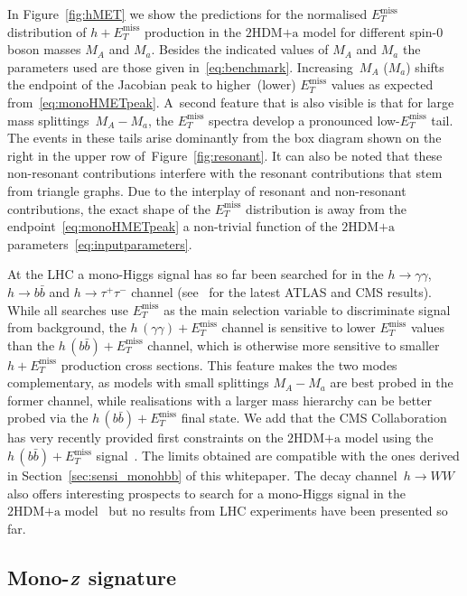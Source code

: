 \documentclass[a4paper, 11pt,notoc]{article}
\newcommand{\MET}{\ensuremath{E_T^\mathrm{miss}}\xspace}
\newcommand{\mA}{\ensuremath{M_{A}}\xspace}
\newcommand{\ma}{\ensuremath{M_{a}}\xspace}
\newcommand{\hdma}{\ensuremath{\textrm{2HDM+a}}\xspace}
\def\bm#1{\mbox{\boldmath$#1$\unboldmath}}
\begin{document}
In Figure~\ref{fig:hMET} we show the predictions for the normalised $\MET$ distribution of $h+\MET$ production in the \hdma model for different spin-0 boson masses $\mA$ and $\ma$. Besides the indicated values of $\mA$ and $\ma$ the parameters  used  are those given in~\eqref{eq:benchmark}. Increasing~$\mA$ ($\ma$) shifts the endpoint of the Jacobian peak to higher~(lower) $\MET$  values as expected from~\eqref{eq:monoHMETpeak}. A~second feature that is also visible is that for large mass splittings~$\mA - \ma$, the $\MET$ spectra develop a pronounced low-$\MET$ tail. The events in these tails arise dominantly from the box diagram shown on the right in the upper row of~Figure~\ref{fig:resonant}. It can also be noted that these non-resonant contributions interfere with the resonant contributions that stem from triangle graphs. Due to the interplay of resonant and non-resonant contributions,  the exact shape of the $\MET$ distribution is away from the endpoint~\eqref{eq:monoHMETpeak} a non-trivial function of the \hdma parameters~\eqref{eq:inputparameters}.  

 At the LHC a mono-Higgs signal has so far been searched for in the $h \to \gamma \gamma$, $h \to b \bar b$ and $h \to \tau^+ \tau^-$ channel (see~\cite{Aaboud:2017uak,ATLAS-CONF-2018-039,CMS-PAS-EXO-16-050,CMS:2018yme}  for the latest ATLAS and CMS results).  While all searches use $\MET$ as the main selection variable to discriminate signal from background,  the  $h \, (\gamma \gamma) + \MET$  channel  is sensitive to lower $\MET$ values than the $h \, (b \bar b) + \MET$  channel, which is otherwise more sensitive to smaller $h + \MET$ production cross sections. This feature makes the two modes complementary, as models with  small  splittings $\mA - \ma$ are best probed in the former channel, while realisations with a larger mass hierarchy can be better probed via the $h \, (b \bar b) + \MET$ final state. We add that the CMS Collaboration has very recently provided first constraints on the \hdma model using the $h \, (b \bar b) + \MET$ signal~\cite{CMS-PAS-EXO-16-050}. The limits obtained are compatible with the ones derived in Section~\ref{sec:sensi_monohbb} of this whitepaper. The decay channel~$h \to WW$ also offers interesting prospects to search for a mono-Higgs signal in the \hdma model~\cite{GPHeidelberg} but no results from LHC experiments have been presented so far. 

\subsection{Mono-$\bm{Z}$ signature}
\end{document}
